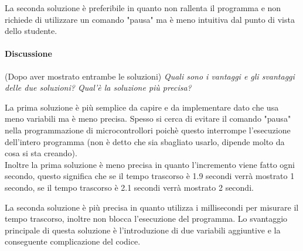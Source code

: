 \documentclass[../../docenti.tex]{subfiles}
\begin{document}
La seconda soluzione è preferibile in quanto non rallenta il programma e non richiede di utilizzare un comando "pausa" ma è meno intuitiva dal punto di vista dello studente.

\paragraph{Discussione} (Dopo aver mostrato entrambe le soluzioni) \textit{Quali sono i vantaggi e gli svantaggi delle due soluzioni? Qual'è la soluzione più precisa?}

\vspace{1em}
La prima soluzione è più semplice da capire e da implementare dato che usa meno variabili ma è meno precisa.
Spesso si cerca di evitare il comando "pausa" nella programmazione di microcontrollori poichè questo interrompe l'esecuzione dell'intero programma (non è detto che sia sbagliato usarlo, dipende molto da cosa si sta creando).\\
Inoltre la prima soluzione è meno precisa in quanto l'incremento viene fatto ogni secondo, questo significa che se il tempo trascorso è 1.9 secondi verrà mostrato 1 secondo, se il tempo trascorso è 2.1 secondi verrà mostrato 2 secondi.

La seconda soluzione è più precisa in quanto utilizza i millisecondi per misurare il tempo trascorso, inoltre non blocca l'esecuzione del programma. Lo svantaggio principale di questa soluzione è l'introduzione di due variabili aggiuntive e la conseguente complicazione del codice.
\end{document}
